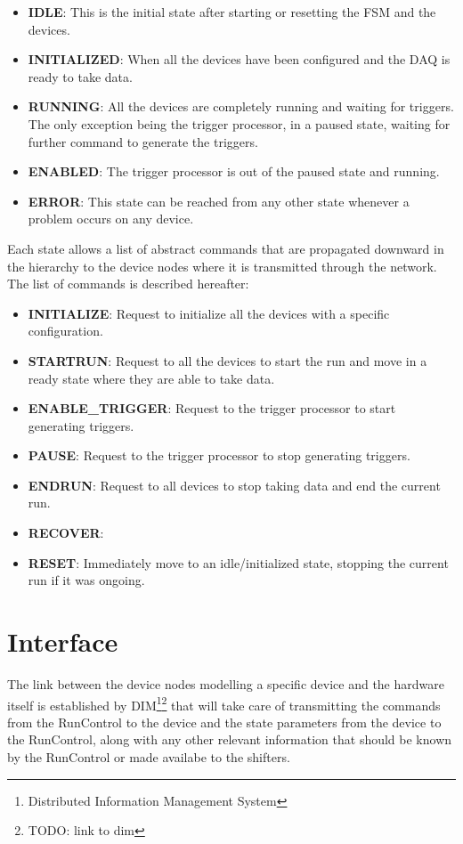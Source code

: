 \documentclass[a4paper]{article}
\newcommand{\note}[1]{\footnote{TODO: {#1}}}
\begin{document}
\begin{itemize}
	\item \textbf{IDLE}: This is the initial state after starting or resetting the FSM and the devices.
	\item \textbf{INITIALIZED}: When all the devices have been configured and the DAQ is ready to take
	data.
	\item \textbf{RUNNING}: All the devices are completely running and waiting for triggers. The only
	exception being the trigger processor, in a paused state, waiting for further command to generate
	the triggers.
	\item \textbf{ENABLED}: The trigger processor is out of the paused state and running.
	\item \textbf{ERROR}: This state can be reached from any other state whenever a problem occurs on
	any device.
\end{itemize}

Each state allows a list of abstract commands that are propagated downward in the hierarchy to
the device nodes where it is transmitted through the network. The list of commands is described
hereafter:

\begin{itemize}
	\item \textbf{INITIALIZE}: Request to initialize all the devices with a specific configuration.
	\item \textbf{STARTRUN}: Request to all the devices to start the run and move in a ready state
	where they are able to take data.
	\item \textbf{ENABLE\_TRIGGER}: Request to the trigger processor to start generating triggers.
	\item \textbf{PAUSE}: Request to the trigger processor to stop generating triggers.
	\item \textbf{ENDRUN}: Request to all devices to stop taking data and end the current run. 
	\item \textbf{RECOVER}:  
	\item \textbf{RESET}: Immediately move to an idle/initialized state, stopping the current run if
	it was ongoing.
\end{itemize}

\section{Interface}
The link between the device nodes modelling a specific device and the hardware itself is
established by DIM\footnote{Distributed Information Management System}\note{link to dim} that will
take care of transmitting the commands from the RunControl to the device and the state parameters from the
device to the RunControl, along with any other relevant information that should be known by the
RunControl or made availabe to the shifters.
\end{document}
